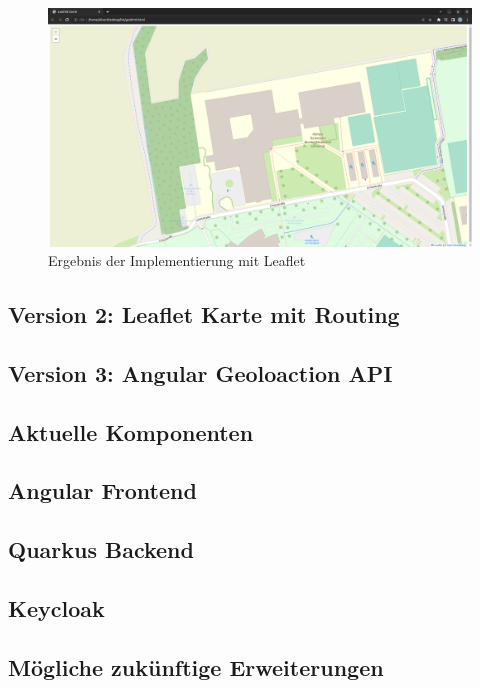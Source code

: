 \begin{figure}[h t]
\centering
\includegraphics[scale=0.2]{pics/leafletmap.png}
\caption{Ergebnis der Implementierung mit Leaflet}
\end{figure}



\begin{spacing}{1}
\subsection{Version 2: Leaflet Karte mit Routing}
\end{spacing}

\begin{spacing}{1}
\subsection{Version 3: Angular Geoloaction API}
\end{spacing}

\begin{spacing}{1}
\section{Aktuelle Komponenten}
\end{spacing}

\begin{spacing}{1}
\subsection{Angular Frontend}
\end{spacing}

\begin{spacing}{1}
\section{Quarkus Backend }
\end{spacing}

\begin{spacing}{1}
\section{Keycloak}
\end{spacing}

\begin{spacing}{1}
\section{Mögliche zukünftige Erweiterungen}
\end{spacing}


